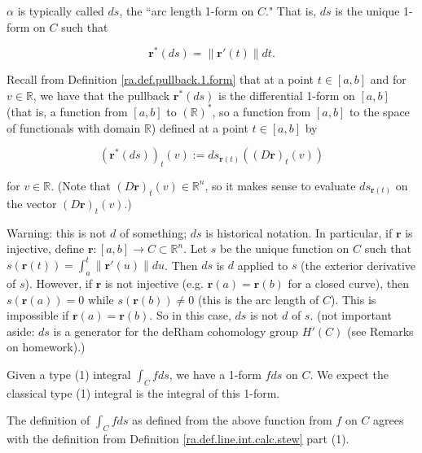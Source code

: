 \(\alpha\) is typically called \(ds\), the ``arc length 1-form on \(C\)." That is, \(ds\) is the unique 1-form on \(C\) such that 

\begin{equation}\label{ra.ds.def.pullback}
\boldsymbol{r}^* (ds) = \lVert \boldsymbol{r}'(t) \rVert dt.
\end{equation}

Recall from Definition \ref{ra.def.pullback.1.form} that at a point \(t \in [a,b]\) and for \(v \in \mathbb{R}\), we have that the pullback \(\boldsymbol{r}^*(ds)\) is the differential 1-form on \([a,b]\) (that is, a function from \([a,b]\) to \((\mathbb{R})^*\), so a function from \([a,b]\) to the space of functionals with domain \(\mathbb{R}\)) defined at a point \(t \in [a,b]\) by

\[
(\boldsymbol{r}^*(ds))_t(v) := ds_{\boldsymbol{r}(t)} ((D\boldsymbol{r})_t(v))
\]

for \(v \in \mathbb{R}\). (Note that \((D\boldsymbol{r})_t(v) \in \mathbb{R}^n\), so it makes sense to evaluate \(ds_{\boldsymbol{r}(t)}\) on the vector \((D\boldsymbol{r})_t(v)\).)



Warning: this is not \(d\) of something; \(ds\) is historical notation. In particular, if \(\boldsymbol{r}\) is injective, define \(\boldsymbol{r}: [a,b] \to C \subset \mathbb{R}^n\). Let \(s\) be the unique function on \(C\) such that \(s(\boldsymbol{r}(t)) = \int_a^t \lVert \boldsymbol{r}'(u) \rVert du\). Then \(ds\) is \(d\) applied to \(s\) (the exterior derivative of \(s\)). However, if \(\boldsymbol{r}\) is not injective (e.g. \(\boldsymbol{r}(a) = \boldsymbol{r}(b)\) for a closed curve), then \(s(\boldsymbol{r}(a)) = 0\) while \(s(\boldsymbol{r}(b)) \neq 0\) (this is the arc length of \(C\)). This is impossible if \(\boldsymbol{r}(a) = \boldsymbol{r}(b)\). So in this case, \(ds\) is not \(d\) of \(s\). (not important aside: \(ds\) is a generator for the deRham cohomology group \(H'(C)\) (see Remarks on homework).)

Given a type (1) integral \(\int_C f ds\), we have a 1-form \(f ds\) on \(C\). We expect the classical type (1) integral is the integral of this 1-form.

\begin{proposition}

The definition of \(\int_C f ds\) as defined from the above function from \(f\) on \(C\) agrees with the definition from Definition \ref{ra.def.line.int.calc.stew} part (1).

\end{proposition}

